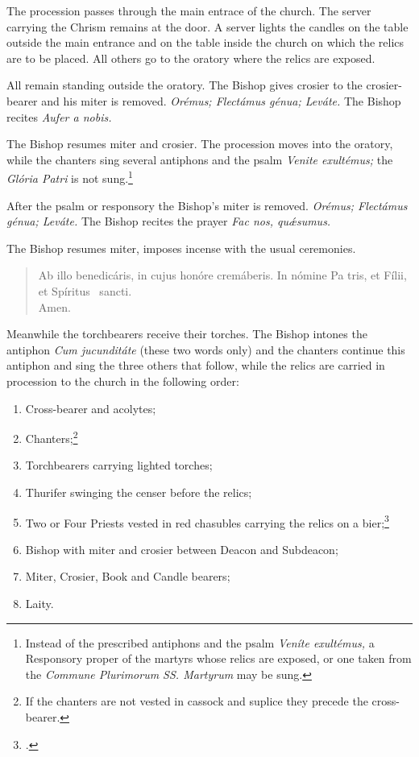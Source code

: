\documentclass[letterpaper]{report}
\newcommand\blessincense{
\begin{quote}
   Ab illo benedicáris, in cujus honóre cremáberis. In nómine Pa\cross
    tris, et Fí\cross lii, et Spíritus \cross\ sancti. \\ \rbar Amen.
\end{quote}
}
\begin{document}
{    The procession passes through the main entrace of the church. The server
    carrying the Chrism remains at the door. A server lights the candles on the
    table outside the main entrance and on the table inside the church on which
    the relics are to be placed. All others go to the oratory where the relics
    are exposed.

    \rubric All remain standing outside the oratory. The Bishop gives crosier
    to the crosier-bearer and his miter is removed. \textit{Orémus; Flectámus
    génua; Leváte.} The Bishop recites \textit{Aufer a nobis.}

    \rubric The Bishop resumes miter and crosier. The procession moves into the
    oratory, while the chanters sing several antiphons and the psalm
    \textit{Venite exult\'emus;} the \textit{Glória Patri} is not
    sung.\footnote{Instead of the prescribed antiphons and the psalm
    \textit{Ven\'ite exult\'emus,} a Responsory proper of the martyrs whose
    relics are exposed, or one taken from the \textit{Commune Plurimorum SS.
    Martyrum} may be sung.}

    \rubric After the psalm or responsory the Bishop's miter is removed.
    \textit{Orémus; Flectámus génua; Leváte.} The Bishop recites the prayer
    \textit{Fac nos, qu\'\ae sumus.}

    \rubric The Bishop resumes miter, imposes incense with the usual ceremonies.

    \blessincense

    Meanwhile the torchbearers receive their torches. The Bishop intones the
    antiphon \textit{Cum jucundit\'ate} (these two words only) and the chanters
    continue this antiphon and sing the three others that follow, while the
    relics are carried in procession to the church in the following order:

    \begin{enumerate}
        \item Cross-bearer and acolytes;
        \item Chanters;\footnote{If the chanters are not vested in cassock and
            suplice they precede the cross-bearer.}
        \item Torchbearers carrying lighted torches;
        \item Thurifer swinging the censer before the relics;
        \item Two or Four Priests vested in red chasubles carrying the relics
            on a bier;\footcite[Instead of these priets the consecrator may
            carry the relics on a salver.][footnote 1, p. 81.]{consecranda}
        \item Bishop with miter and crosier between Deacon and Subdeacon;
        \item Miter, Crosier, Book and Candle bearers;
        \item Laity.
    \end{enumerate}

}
\end{document}
